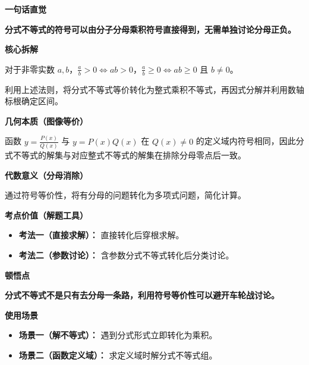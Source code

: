 \begin{explanationbox}

	\textbf{\textcolor{CExplanation}{一句话直觉}}

	\textbf{分式不等式的符号可以由分子分母乘积符号直接得到，无需单独讨论分母正负。}

	\medskip
	\textbf{\textcolor{CExplanation}{核心拆解}}
	\begin{description}[style=nextline, leftmargin=2.8em, labelsep=0.5em, itemsep=0.45em]
		\item[\textbf{要点一（符号法则）：}] 对于非零实数 $a,b$，$\frac{a}{b}>0 \iff ab>0$，$\frac{a}{b}\ge 0 \iff ab\ge 0$ 且 $b\neq 0$。
		\item[\textbf{要点二（转化步骤）：}] 利用上述法则，将分式不等式等价转化为整式乘积不等式，再因式分解并利用数轴标根确定区间。
	\end{description}

	\medskip
	\textbf{\textcolor{CExplanation}{几何本质（图像等价）}}

	函数 $y=\frac{P(x)}{Q(x)}$ 与 $y=P(x)Q(x)$ 在 $Q(x)\neq 0$ 的定义域内符号相同，因此分式不等式的解集与对应整式不等式的解集在排除分母零点后一致。

	\medskip
	\textbf{\textcolor{CExplanation}{代数意义（分母消除）}}

	通过符号等价性，将有分母的问题转化为多项式问题，简化计算。

	\medskip
	\textbf{\textcolor{CExplanation}{考点价值（解题工具）}}
	\begin{itemize}[leftmargin=*, itemsep=0.5em, topsep=0.4em]
		\item \textbf{考法一（直接求解）：} 直接转化后穿根求解。
		\item \textbf{考法二（参数讨论）：} 含参数分式不等式转化后分类讨论。
	\end{itemize}

	\medskip
	\textbf{\textcolor{CExplanation}{顿悟点}}

	\textbf{分式不等式不是只有去分母一条路，利用符号等价性可以避开车轮战讨论。}

	\medskip
	\textbf{\textcolor{CExplanation}{使用场景}}
	\begin{itemize}[leftmargin=*, itemsep=0.5em, topsep=0.4em]
		\item \textbf{场景一（解不等式）：} 遇到分式形式立即转化为乘积。
		\item \textbf{场景二（函数定义域）：} 求定义域时解分式不等式组。
	\end{itemize}

\end{explanationbox}
